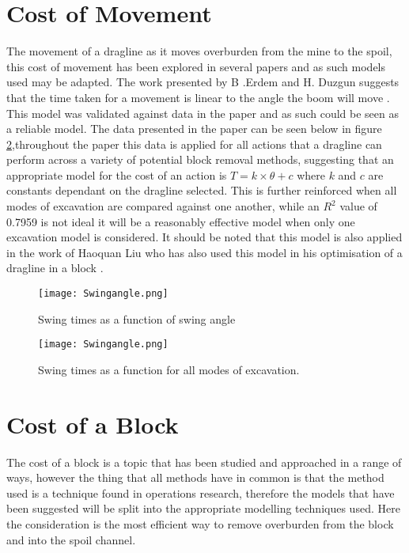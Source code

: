 
\section{Cost of Movement}
The movement of a dragline as it moves overburden from the mine to the spoil, this cost of movement has been explored in several papers and as such models used may be adapted. The work presented by B .Erdem and H. Duzgun
suggests that the time taken for a movement is linear to the angle the boom will move \cite{Dmove}. This model was validated against data in the paper and as such could be seen as a reliable model. The data presented in the paper can be seen below in figure \ref{Swingangle},throughout the paper this data is applied for all actions that a dragline can perform across a variety of potential block removal methods, suggesting that an appropriate model for the cost of an action is \(T = k\times \theta + c\) \cite{Dmove} where $k$ and $c$ are constants dependant on the dragline selected. This is further reinforced when all modes of excavation are compared against one another, while an $R^2$ value of 0.7959 \cite{Dmove} is not ideal it will be a reasonably effective model when only one excavation model is considered. It should be noted that this model is also applied in the work of Haoquan Liu who has also used this model in his optimisation of a dragline in a block \cite{A*Search}. 

\begin{figure}[h]
\caption{Swing times as a function of swing angle}
\label{Swingangle}
\texttt{[image: Swingangle.png]}
\end{figure}

\begin{figure}[h]
\caption{Swing times as a function for all modes of excavation.}
\label{Swingangle}
\texttt{[image: Swingangle.png]}
\end{figure}


\section{Cost of a Block}
The cost of a block is a topic that has been studied and approached in a range of ways, however the thing that all methods have in common is that the method used is a technique found in operations research\cite{A*Search}\cite{PacificCoal}, therefore the models that have been suggested will be split into the appropriate modelling techniques used. Here the consideration is the most efficient way to remove overburden from the block and into the spoil channel. 

